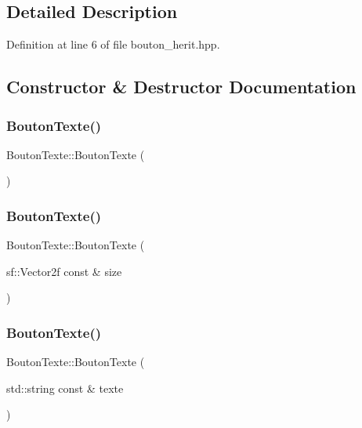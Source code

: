 \subsection{Detailed Description}


Definition at line 6 of file bouton\+\_\+herit.\+hpp.



\subsection{Constructor \& Destructor Documentation}
\mbox{\label{classBoutonTexte_a2a7d9babee8e65e776e83e5765e1ce60}} 
\subsubsection{\texorpdfstring{Bouton\+Texte()}{BoutonTexte()}\hspace{0.1cm}{\footnotesize\ttfamily [1/8]}}
{\footnotesize\ttfamily Bouton\+Texte\+::\+Bouton\+Texte (\begin{DoxyParamCaption}{ }\end{DoxyParamCaption})}

\mbox{\label{classBoutonTexte_a1051f539ed840e2552725892d9a57194}} 
\subsubsection{\texorpdfstring{Bouton\+Texte()}{BoutonTexte()}\hspace{0.1cm}{\footnotesize\ttfamily [2/8]}}
{\footnotesize\ttfamily Bouton\+Texte\+::\+Bouton\+Texte (\begin{DoxyParamCaption}\item[{sf\+::\+Vector2f const \&}]{size }\end{DoxyParamCaption})}

\mbox{\label{classBoutonTexte_ad48d557bfa607a183f57485f32795264}} 
\subsubsection{\texorpdfstring{Bouton\+Texte()}{BoutonTexte()}\hspace{0.1cm}{\footnotesize\ttfamily [3/8]}}
{\footnotesize\ttfamily Bouton\+Texte\+::\+Bouton\+Texte (\begin{DoxyParamCaption}\item[{std\+::string const \&}]{texte }\end{DoxyParamCaption})}

